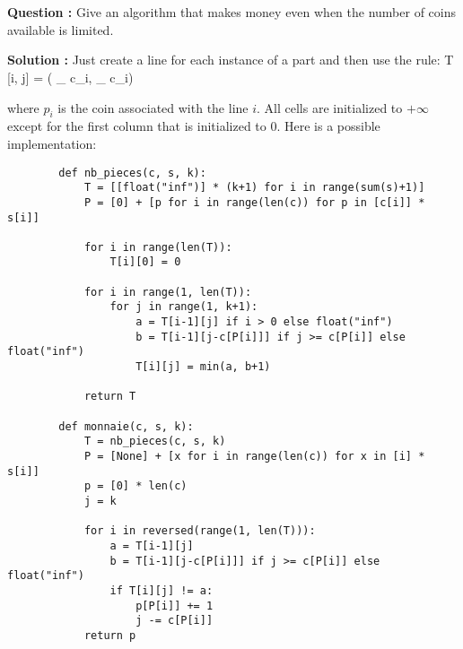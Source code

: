 \documentclass[11pt]{article} %
\newenvironment{question}[1][\unskip]{%
	\par
	\noindent
	\textbf{Question #1:}
	\noindent}
{\medskip}
\newenvironment{solution}[1][\unskip]{%
	\par
	\noindent
	\textbf{Solution #1:}
	\noindent}
{\medskip}
\begin{document}
	\section{}
	\begin{question}
		Give an algorithm that makes money even when the number of coins available is limited.
	\end{question}
	
	\begin{solution}
		Just create a line for each instance of a part and then use the rule:
			T [i, j] = \min ( _ { c_i},  _ { c_i})
		
		where $ p_i $ is the coin associated with the line $ i $. All cells are initialized to $ + \infty $ except for the first column that is initialized to 0. Here is a possible implementation:

		\begin{lstlisting}
		def nb_pieces(c, s, k):
			T = [[float("inf")] * (k+1) for i in range(sum(s)+1)]
			P = [0] + [p for i in range(len(c)) for p in [c[i]] * s[i]]
			
			for i in range(len(T)):
				T[i][0] = 0
			
			for i in range(1, len(T)):
				for j in range(1, k+1):
					a = T[i-1][j] if i > 0 else float("inf")
					b = T[i-1][j-c[P[i]]] if j >= c[P[i]] else float("inf")
					T[i][j] = min(a, b+1)
			
			return T
		
		def monnaie(c, s, k):
			T = nb_pieces(c, s, k)
			P = [None] + [x for i in range(len(c)) for x in [i] * s[i]]
			p = [0] * len(c)
			j = k
			
			for i in reversed(range(1, len(T))):
				a = T[i-1][j]
				b = T[i-1][j-c[P[i]]] if j >= c[P[i]] else float("inf")
				if T[i][j] != a:
					p[P[i]] += 1
					j -= c[P[i]]
			return p
		\end{lstlisting}
	\end{solution}
\end{document}
